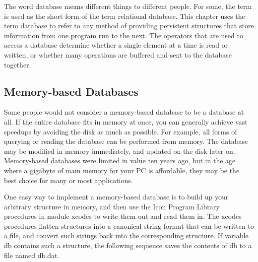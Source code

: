 The word {\textquotedbl}database{\textquotedbl} means different things
to different people. For some, the term is used as the short form of
the term {\textquotedbl}relational database.{\textquotedbl} This
chapter uses the term database to refer to any method of providing
{\textquotedbl}persistent structures{\textquotedbl} that store
information from one program run to the next. The operators that are
used to access a database determine whether a single element at a time
is read or written, or whether many operations are buffered and sent to
the database together.

\subsection{Memory-based Databases}

Some people would not consider a memory-based
database to be a database at all. If the
entire database fits in memory at once, you can generally achieve vast
speedups by avoiding the disk as much as possible. For example, all
forms of querying or reading the database can be performed from memory.
The database may be modified in memory immediately, and updated on the
disk later on. Memory-based databases were limited in value ten years
ago, but in the age where a gigabyte of main memory for your PC is
affordable, they may be the best choice for many or most applications.

One easy way to implement a memory-based database is to build up your
arbitrary structure in memory, and then use the Icon Program Library
procedures in module \textsf{xcodes} to write them out and read them
in. The \textsf{xcodes} procedures flatten structures
into a canonical string format that can be written to a file, and
convert such strings back into the corresponding structure. If variable
\textsf{db} contains such a structure, the following sequence saves the
contents of \textsf{db} to a file named \textsf{db.dat.}


